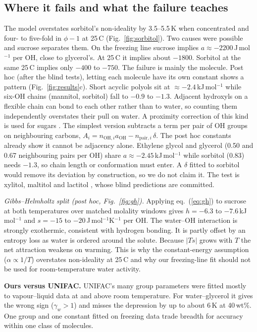 \documentclass[10pt,a4paper,twocolumn]{article}
\newcommand{\aoh}{a_{\mathrm{OH}}}
\begin{document}
\subsection{Where it fails and what the failure teaches}
The model overstates sorbitol's non-ideality by 3.5--5.5\,K when concentrated and four- to five-fold in
$\phi-1$ at 25\,\textdegree C (Fig.~\ref{fig:sorbitol}). Two causes were possible and sucrose separates them.
On the freezing line sucrose implies $a\approx-2200$\,J\,mol$^{-1}$ per OH, close to glycerol's. At
25\,\textdegree C it implies about $-1800$. Sorbitol at the same 25\,\textdegree C implies only $-400$ to $-750$. The failure
is mainly the molecule. Post hoc (after the blind tests), letting each molecule have its own constant shows a
pattern (Fig.~\ref{fig:results}c). Short acyclic polyols sit at $\approx-2.4$\,kJ\,mol$^{-1}$ while six-OH
chains (mannitol, sorbitol) fall to $-0.9$ to $-1.3$. Adjacent hydroxyls on a flexible chain can bond to each
other rather than to water, so counting them independently overstates their pull on water. A proximity
correction of this kind is used for sugars \cite{peres}. The simplest version subtracts a term per pair of OH
groups on neighbouring carbons, $A_i=n_{\mathrm{OH},i}\aoh-n_{\mathrm{pair},i}\,\delta$. The post hoc constants
already show it cannot be adjacency alone. Ethylene glycol and glycerol (0.50 and 0.67 neighbouring pairs per
OH) share $a\approx-2.45$\,kJ\,mol$^{-1}$ while sorbitol (0.83) needs $-1.3$, so chain length or conformation
must enter. A $\delta$ fitted to sorbitol would remove its deviation by construction, so we do not claim it.
The test is xylitol, maltitol and lactitol \cite{uraji}, whose blind predictions are committed.


\emph{Gibbs--Helmholtz split (post hoc, Fig.~\ref{fig:gh}).} Applying eq.~(\ref{eq:gh}) to sucrose at both
temperatures over matched molality windows gives $h=-6.3$ to $-7.6$\,kJ\,mol$^{-1}$ and $s=-15$ to
$-20$\,J\,mol$^{-1}$K$^{-1}$ per OH. The water--OH interaction is strongly exothermic, consistent with hydrogen
bonding. It is partly offset by an entropy loss as water is ordered around the solute. Because $|Ts|$ grows
with $T$ the net attraction weakens on warming. This is why the constant-energy assumption ($\alpha\propto1/T$)
overstates non-ideality at 25\,\textdegree C and why our freezing-line fit should not be used for
room-temperature water activity.

\textbf{Ours versus UNIFAC.} UNIFAC's many group parameters were fitted mostly to vapour--liquid data at and
above room temperature. For water--glycerol it gives the wrong sign ($\gamma_w>1$) and misses the depression by
up to about 6\,K at 40\,wt\%. One group and one constant fitted on freezing data trade breadth for accuracy
within one class of molecules.
\end{document}
